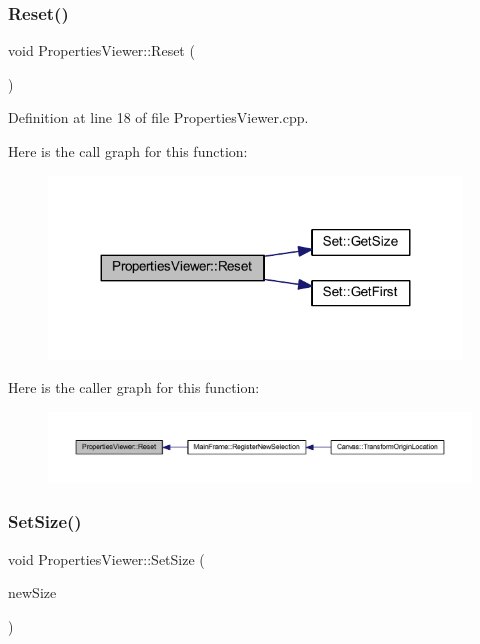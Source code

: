\subsubsection{\texorpdfstring{Reset()}{Reset()}}
{\footnotesize\ttfamily void Properties\+Viewer\+::\+Reset (\begin{DoxyParamCaption}{ }\end{DoxyParamCaption})}



Definition at line 18 of file Properties\+Viewer.\+cpp.

Here is the call graph for this function\+:
\nopagebreak
\begin{figure}[H]
\begin{center}
\leavevmode
\includegraphics[width=311pt]{class_properties_viewer_a610dc708815ecdc748c2898551f086c0_cgraph}
\end{center}
\end{figure}
Here is the caller graph for this function\+:
\nopagebreak
\begin{figure}[H]
\begin{center}
\leavevmode
\includegraphics[width=350pt]{class_properties_viewer_a610dc708815ecdc748c2898551f086c0_icgraph}
\end{center}
\end{figure}
\mbox{\label{class_properties_viewer_a584378c78158525069fccc64ba446821}} 
\subsubsection{\texorpdfstring{Set\+Size()}{SetSize()}}
{\footnotesize\ttfamily void Properties\+Viewer\+::\+Set\+Size (\begin{DoxyParamCaption}\item[{wx\+Size}]{new\+Size }\end{DoxyParamCaption})}



